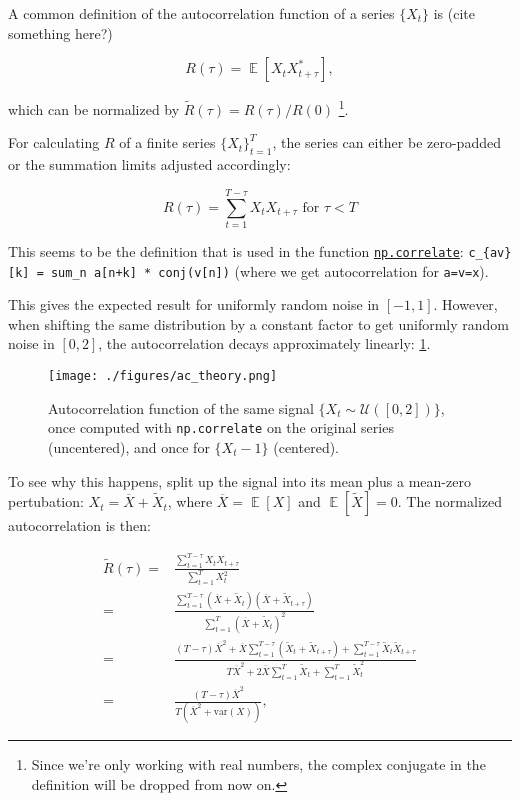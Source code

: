 \documentclass[11pt]{article}
\newcommand{\E}[1]{{\mathop{\mathbb{E}}\left[ #1 \right]}}
\begin{document}
A common definition of the autocorrelation function of a series \(\{X_t\}\) is (cite something here?)

\begin{equation}
\label{eqn:def_ac}
R(\tau) = \E{X_t X_{t+\tau}^*},
\end{equation}

which can be normalized by \(\tilde{R}(\tau) = R(\tau) / R(0)\) \footnote{Since we're only working with real numbers, the complex conjugate in the definition will
be dropped from now on.}.

For calculating \(R\) of a finite series \(\{X_t\}_{t=1}^{T}\), the series can either be
zero-padded or the summation limits adjusted accordingly:

\begin{equation}
R(\tau) = \sum_{t=1}^{T-\tau} X_t X_{t+\tau} \text{  for } \tau < T
\end{equation}

This seems to be the definition that is used in the function \href{https://numpy.org/doc/1.18/reference/generated/numpy.correlate.html}{\texttt{np.correlate}}:
\texttt{c\_\{av\}[k] = sum\_n a[n+k] * conj(v[n])} (where we get autocorrelation for \texttt{a=v=x}).

This gives the expected result for uniformly random noise in \([-1, 1]\). However, when shifting
the same distribution by a constant factor to get uniformly random noise in \([0, 2]\), the
autocorrelation decays approximately linearly: \ref{fig:ac_uni}.

\begin{figure}[htbp]
\centering
\texttt{[image: ./figures/ac\_theory.png]}
\caption{\label{fig:ac_uni}
Autocorrelation function of the same signal \(\{X_t \sim \mathcal{U}([0,2])\}\), once computed with \texttt{np.correlate} on the original series (uncentered), and once for \(\{X_t - 1\}\) (centered).}
\end{figure}

To see why this happens, split up the signal into its mean plus a mean-zero pertubation:
\(X_t = \overline{X} + \tilde{X}_t\), where \(\overline{X} = \E{X}\) and \(\E{\tilde{X}} = 0\).
The normalized autocorrelation is then:

\begin{align}
\tilde{R}(\tau) =& \frac{\sum_{t=1}^{T-\tau} X_t X_{t+\tau}}
                        {\sum_{t=1}^{T} X_t^2} \\
                =& \frac{\sum_{t=1}^{T-\tau} (\overline{X} + \tilde{X}_t) (\overline{X} + \tilde{X}_{t+\tau})}
                        {\sum_{t=1}^{T} (\overline{X} + \tilde{X}_t)^2} \\
                =& \frac{(T-\tau) \overline{X}^2 + \overline{X} \sum_{t=1}^{T-\tau} (\tilde{X}_t + \tilde{X}_{t+\tau}) + \sum_{t=1}^{T-\tau}\tilde{X}_t \tilde{X}_{t+\tau}}
                        {T \overline{X}^2 + 2 \overline{X} \sum_{t=1}^T \tilde{X}_t + \sum_{t=1}^T \tilde{X}_t^2} \\
                =& \frac{(T-\tau) \overline{X}^2}
                        {T(\overline{X}^2 + \text{var}(X))},
\end{align}
\end{document}
